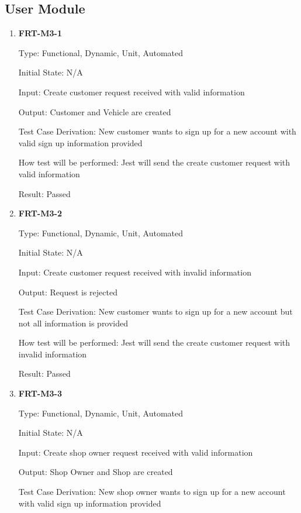 \documentclass[12pt, titlepage]{article}
\begin{document}
\subsection{User Module}

\begin{enumerate}

	\item \textbf{FRT-M3-1}

	      Type: Functional, Dynamic, Unit, Automated

	      Initial State: N/A

	      Input: Create customer request received with valid information

	      Output: Customer and Vehicle are created

	      Test Case Derivation: New customer wants to sign up for a new account with valid sign up
	      information provided

	      How test will be performed: Jest will send the create customer request with valid information

	      Result: Passed

	\item \textbf{FRT-M3-2}

	      Type: Functional, Dynamic, Unit, Automated

	      Initial State: N/A

	      Input: Create customer request received with invalid information

	      Output: Request is rejected

	      Test Case Derivation: New customer wants to sign up for a new account but not all information is
	      provided

	      How test will be performed: Jest will send the create customer request with invalid information

	      Result: Passed

	\item \textbf{FRT-M3-3}

	      Type: Functional, Dynamic, Unit, Automated

	      Initial State: N/A

	      Input: Create shop owner request received with valid information

	      Output: Shop Owner and Shop are created

	      Test Case Derivation: New shop owner wants to sign up for a new account with valid sign up
	      information provided


\end{enumerate}
\end{document}
